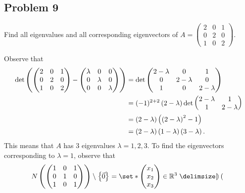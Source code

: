 \documentclass[main.tex]{subfiles}
\begin{document}
\subsection{Problem 9}
\begin{claim}
    Find all eigenvalues and all corresponding eigenvectors of $A = \begin{pmatrix}
        2 & 0 & 1 \\
        0 & 2 & 0 \\
        1 & 0 & 2
    \end{pmatrix}$.
\end{claim}

\begin{soln}
    Observe that
    \begin{align*}
    \det\left( \begin{pmatrix}2 & 0 & 1 \\ 0 & 2 & 0 \\ 1 & 0 & 2\end{pmatrix} - \begin{pmatrix}\lambda & 0 & 0 \\ 0 & \lambda & 0 \\ 0 & 0 &\lambda\end{pmatrix} \right) &= \det\begin{pmatrix} 2 - \lambda & 0 & 1 \\ 0 & 2 - \lambda & 0 \\ 1 & 0 & 2 - \lambda\end{pmatrix} \\
    &= (-1)^{2 + 2}\left( 2 - \lambda \right)\det\begin{pmatrix}
        2 - \lambda & 1 \\
        1 & 2 - \lambda
    \end{pmatrix} \\
    &= \left( 2 - \lambda \right)\left( \left( 2 - \lambda \right)^2 - 1 \right) \\
    &= \left( 2 - \lambda \right)\left( 1 - \lambda \right)\left( 3 - \lambda \right).
    \end{align*}
    This means that $A$ has 3 eigenvalues $\lambda = 1, 2, 3$. To find the eigenvectors corresponding to $\lambda = 1$, observe that
    \begin{align*}
    N\parens{\begin{pmatrix}
        1 & 0 & 1 \\
        0 & 1 & 0 \\
        1 & 0 & 1
    \end{pmatrix}} \setminus\braces{\vec{0}} &= \set*{\begin{pmatrix} x_1 \\ x_2 \\ x_3\end{pmatrix} \in \RR^3\mid \begin{pmatrix}

\end{pmatrix}}
\end{align*}
\end{soln}
\end{document}
